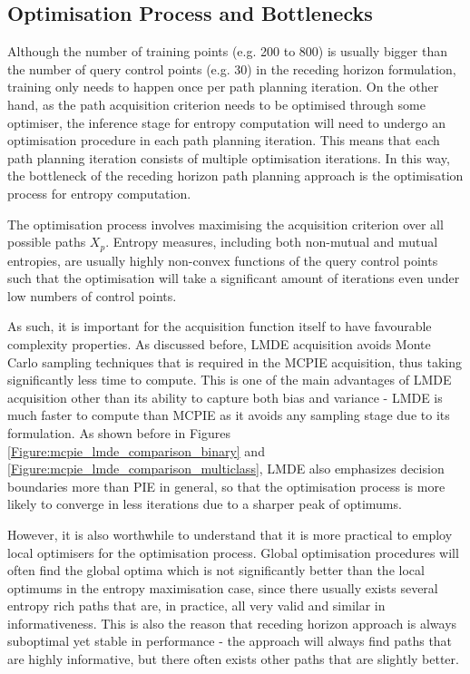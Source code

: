 		\subsection{Optimisation Process and Bottlenecks}
		\label{InformativeSeafloorExploration:RecedingHorizonFormulation:OptimisationProcess}
	
			Although the number of training points (e.g. 200 to 800) is usually bigger than the number of query control points (e.g. 30) in the receding horizon formulation, training only needs to happen once per path planning iteration. On the other hand, as the path acquisition criterion needs to be optimised through some optimiser, the inference stage for entropy computation will need to undergo an optimisation procedure in each path planning iteration. This means that each path planning iteration consists of multiple optimisation iterations. In this way, the bottleneck of the receding horizon path planning approach is the optimisation process for entropy computation.
				
			The optimisation process involves maximising the acquisition criterion over all possible paths $X_{p}$. Entropy measures, including both non-mutual and mutual entropies, are usually highly non-convex functions of the query control points such that the optimisation will take a significant amount of iterations even under low numbers of control points.
			
			As such, it is important for the acquisition function itself to have favourable complexity properties. As discussed before, LMDE acquisition avoids Monte Carlo sampling techniques that is required in the MCPIE acquisition, thus taking significantly less time to compute. This is one of the main advantages of LMDE acquisition other than its ability to capture both bias and variance - LMDE is much faster to compute than MCPIE as it avoids any sampling stage due to its formulation. As shown before in Figures \ref{Figure:mcpie_lmde_comparison_binary} and \ref{Figure:mcpie_lmde_comparison_multiclass}, LMDE also emphasizes decision boundaries more than PIE in general, so that the optimisation process is more likely to converge in less iterations due to a sharper peak of optimums.
			
			However, it is also worthwhile to understand that it is more practical to employ local optimisers for the optimisation process. Global optimisation procedures will often find the global optima which is not significantly better than the local optimums in the entropy maximisation case, since there usually exists several entropy rich paths that are, in practice, all very valid and similar in informativeness. This is also the reason that receding horizon approach is always suboptimal yet stable in performance - the approach will always find paths that are highly informative, but there often exists other paths that are slightly better.
						
